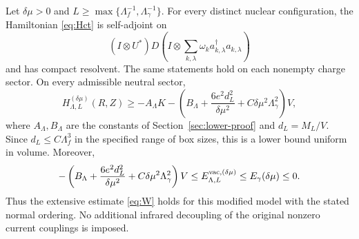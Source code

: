 \begin{theorem}
\label{thm:ct}
Let \(\delta\mu>0\) and
\(L\geq\max\{\Lambda_f^{-1},\Lambda_\gamma^{-1}\}\).
For every distinct nuclear configuration, the Hamiltonian
\eqref{eq:Hct} is self-adjoint on
\[
 (I\otimes U^*)D\left(I\otimes\sum_{k,\lambda}
                         \omega_k a^\dagger_{k,\lambda}a_{k,\lambda}\right)
\]
and has compact resolvent. The same statements hold on each nonempty
charge sector. On every admissible neutral sector,
\begin{equation}
 H^{(\delta\mu)}_{\Lambda,L}(R,Z)
 \geq-A_\Lambda K-
 \left(B_\Lambda+\frac{6e^2d_L^2}{\delta\mu^2}
                  +C\delta\mu^2\Lambda_\gamma^2\right)V,
 \label{eq:ct-bound}
\end{equation}
where \(A_\Lambda,B_\Lambda\) are the constants of
Section~\ref{sec:lower-proof} and \(d_L=M_L/V\).
Since \(d_L\leq C\Lambda_f^3\) in the specified range of box sizes,
this is a lower bound uniform in volume. Moreover,
\begin{equation}
 -\left(B_\Lambda+\frac{6e^2d_L^2}{\delta\mu^2}
                  +C\delta\mu^2\Lambda_\gamma^2\right)V
 \leq E^{\mathrm{vac},(\delta\mu)}_{\Lambda,L}
 \leq E_\gamma(\delta\mu)\leq0.
 \label{eq:ct-vac}
\end{equation}
Thus the extensive estimate \eqref{eq:W} holds for this modified model
with the stated normal ordering. No additional infrared decoupling of
the original nonzero current couplings is imposed.
\end{theorem}
